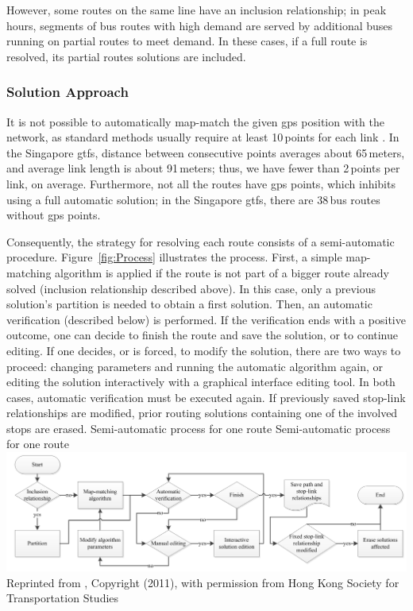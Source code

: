 However, some routes on the same line have an inclusion relationship; in peak hours, segments of bus routes with high demand are served by additional buses running on partial routes to meet demand. In these cases, if a full route is resolved, its partial routes solutions are included.

\subsubsection{Solution Approach}
It is not possible to automatically map-match the given \gls{gps} position with the network, as standard methods usually require at least 10\,points for each link \citep[][]{SchuesslerAxhausen_TechRep_IVT_2009}. In the Singapore \gls{gtfs}, distance between consecutive points averages about 65\,meters, and average link length is about 91\,meters; thus, we have fewer than 2\,points per link, on average. Furthermore, not all the routes have \gls{gps} points, which inhibits using a full automatic solution; in the Singapore \gls{gtfs}, there are 38\,bus routes without \gls{gps} points.

Consequently, the strategy for resolving each route consists of a semi-automatic procedure. Figure~\ref{fig:Process} illustrates the process. First, a simple map-matching algorithm is applied if the route is not part of a bigger route already solved (inclusion relationship described above). In this case, only a previous solution's partition is needed to obtain a first solution. Then, an automatic verification (described below) is performed. If the verification ends with a positive outcome, one can decide to finish the route and save the solution, or to continue editing. If one decides, or is forced, to modify the solution, there are two ways to proceed: changing parameters and running the automatic algorithm again, or editing the solution interactively with a graphical interface editing tool. In both cases, automatic verification must be executed again. If previously saved stop-link relationships are modified, prior routing solutions containing one of the involved stops are erased.
%
\createfigure
{Semi-automatic process for one route}
{Semi-automatic process for one route}
{\label{fig:Process}}
{\includegraphics[width=1.0\textwidth]{extending/figures/semiAuto/Process.png}}
{Reprinted from \citet[][p.754]{Ordonez_HKSTS_2011}, Copyright (2011), with permission from Hong Kong Society for Transportation Studies}

